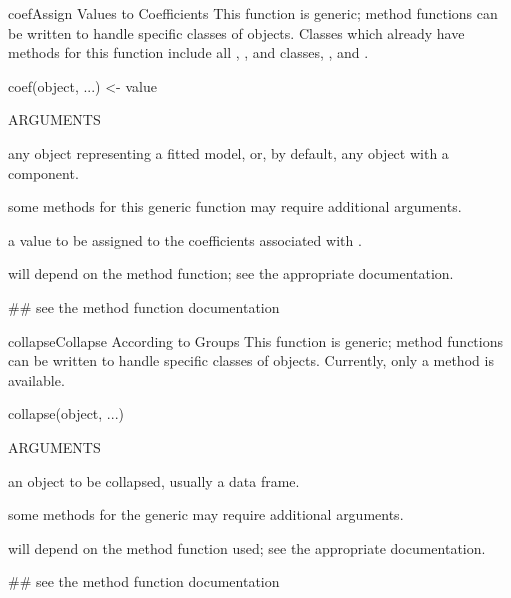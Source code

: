 \documentclass[pdftex]{article} \usepackage{url,graphicx}
\begin{document}
\begin{Helpfile}{coef\Co{<-}}{Assign Values to Coefficients}
This function is generic; method functions can be written to handle
specific classes of objects. Classes which already have methods for
this function include all , , and 
 classes, , and .
\begin{Example}
coef(object, ...) <-  value
\end{Example}
\begin{Argument}{ARGUMENTS}
\item[\Co{object:}]
any object representing a fitted model, or, by default,
any object with a  component.
\item[\Co{...:}]
some methods for this generic function may require
additional arguments.
\item[\Co{value:}]
a value to be assigned to the coefficients associated with
.
\end{Argument}
will depend on the method function; see the appropriate documentation.
\need 15pt
\vspace{-16pt} 
\begin{Example}
## see the method function documentation
\end{Example}
\end{Helpfile}
\begin{Helpfile}{collapse}{Collapse According to Groups}
This function is generic; method functions can be written to handle
specific classes of objects. Currently, only a 
method is available.
\begin{Example}
collapse(object, ...)
\end{Example}
\begin{Argument}{ARGUMENTS}
\item[\Co{object:}]
an object to be collapsed, usually a data frame.
\item[\Co{...:}]
some methods for the generic may require additional
arguments.
\end{Argument}
will depend on the method function used; see the appropriate documentation.
\need 15pt
\vspace{-16pt} 
\begin{Example}
## see the method function documentation
\end{Example}
\end{Helpfile}
\end{document}
